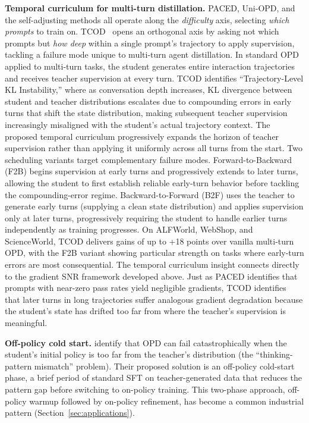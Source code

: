 \documentclass{article} %
\begin{document}
\textbf{Temporal curriculum for multi-turn distillation.} PACED, Uni-OPD, and the self-adjusting methods all operate along the \emph{difficulty} axis, selecting \emph{which prompts} to train on. TCOD~\citep{2604.24005} opens an orthogonal axis by asking not which prompts but \emph{how deep} within a single prompt's trajectory to apply supervision, tackling a failure mode unique to multi-turn agent distillation. In standard OPD applied to multi-turn tasks, the student generates entire interaction trajectories and receives teacher supervision at every turn. TCOD identifies ``Trajectory-Level KL Instability,'' where as conversation depth increases, KL divergence between student and teacher distributions escalates due to compounding errors in early turns that shift the state distribution, making subsequent teacher supervision increasingly misaligned with the student's actual trajectory context. The proposed temporal curriculum progressively expands the horizon of teacher supervision rather than applying it uniformly across all turns from the start. Two scheduling variants target complementary failure modes. Forward-to-Backward (F2B) begins supervision at early turns and progressively extends to later turns, allowing the student to first establish reliable early-turn behavior before tackling the compounding-error regime. Backward-to-Forward (B2F) uses the teacher to generate early turns (supplying a clean state distribution) and applies supervision only at later turns, progressively requiring the student to handle earlier turns independently as training progresses. On ALFWorld, WebShop, and ScienceWorld, TCOD delivers gains of up to +18 points over vanilla multi-turn OPD, with the F2B variant showing particular strength on tasks where early-turn errors are most consequential. The temporal curriculum insight connects directly to the gradient SNR framework developed above. Just as PACED identifies that prompts with near-zero pass rates yield negligible gradients, TCOD identifies that later turns in long trajectories suffer analogous gradient degradation because the student's state has drifted too far from where the teacher's supervision is meaningful.

\textbf{Off-policy cold start.} \citet{2604.13016} identify that OPD can fail catastrophically when the student's initial policy is too far from the teacher's distribution (the ``thinking-pattern mismatch'' problem). Their proposed solution is an off-policy cold-start phase, a brief period of standard SFT on teacher-generated data that reduces the pattern gap before switching to on-policy training. This two-phase approach, off-policy warmup followed by on-policy refinement, has become a common industrial pattern (Section~\ref{sec:applications}).
\end{document}
